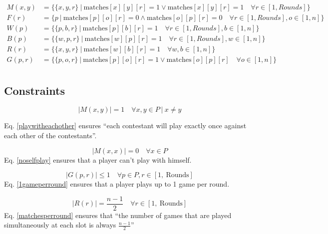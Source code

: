 \documentclass[a4paper, 10pt]{article}
\begin{document}
\begin{align*}
    M(x, y)   &= \{ \{x, y, r\} \ | \ \text{matches}[x][y][r] = 1 \lor \text{matches}[x][y][r] = 1 \quad \forall r \in [1, Rounds]\}\\
    F(r)      &= \{ p \ | \ \text{matches}[p][o][r] = 0 \land \text{matches}[o][p][r] = 0 \quad \forall r \in [1, Rounds], o \in [1, n]\}\\
    W(p)      &= \{ \{p, b, r\} \ | \ \text{matches}[p][b][r] = 1  \quad \forall r \in [1, Rounds], b \in [1, n]\}\\
    B(p)      &= \{ \{w, p, r\} \ | \ \text{matches}[w][p][r] = 1  \quad \forall r \in [1, Rounds], w \in [1, n]\}\\
    R(r)      &= \{ \{x, y, r\} \ | \ \text{matches}[w][b][r] = 1  \quad \forall w, b \in [1, n]\}\\
    G(p, r)   &= \{ \{p, o, r\} \ | \ \text{matches}[p][o][r] = 1  \lor \text{matches}[o][p][r] \quad \forall o \in [1, n]\}\\
\end{align*}

\subsection{Constraints}

\begin{equation}
    \label{playwitheachother}
    |M(x,y)| = 1 \quad \forall x,y \in P \ | \  x \neq y
\end{equation}

Eq. \ref{playwitheachother} ensures ``each contestant will play exactly once against each other of the contestants''.

\begin{equation}
    \label{noselfplay}
    |M(x,x)| = 0 \quad \forall x \in P 
\end{equation}
Eq. \ref{noselfplay} ensures that a player can't play with himself. 

\begin{equation}
    \label{1gameperround}
    |G(p,r)| \leq 1 \quad \forall p \in P, r \in [1, \ \text{Rounds}] 
\end{equation}
Eq. \ref{1gameperround} ensures that a player plays up to 1 game per round.

\begin{equation}
    \label{matchesperround}
    |R(r)| = \frac{n-1}{2}  \quad \forall r \in [1,\ \text{Rounds}] 
\end{equation}
Eq. \ref{matchesperround} ensures that ``the number of games that are played simultaneously at each slot is always $\frac{n-1}{2}$''
\end{document}
